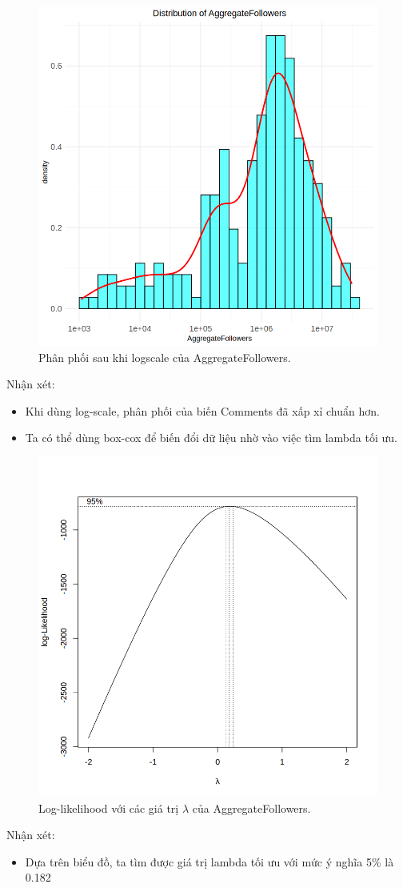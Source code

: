 \begin{figure}[H]
    \centering
    \includegraphics[width=0.75\columnwidth]{csm_figures/af_logscale_distribution.png}
    \caption{Phân phối sau khi logscale của AggregateFollowers.}
    \label{fig:af_logscale_distribution}
\end{figure}
Nhận xét:
\begin{itemize}
    \item Khi dùng log-scale, phân phối của biến Comments đã xấp xỉ chuẩn hơn.
    \item Ta có thể dùng box-cox để biến đổi dữ liệu nhờ vào việc tìm lambda tối ưu.
\end{itemize}

\begin{figure}[H]
    \centering
    \includegraphics[width=0.75\columnwidth]{csm_figures/af_optimal_lambda.png}
    \caption{Log-likelihood với các giá trị $\lambda$ của AggregateFollowers.}
    \label{fig:af_optimal_lambda}
\end{figure}
Nhận xét:
\begin{itemize}
    \item Dựa trên biểu đồ, ta tìm được giá trị lambda tối ưu với mức ý nghĩa 5\% là 0.182
\end{itemize}

